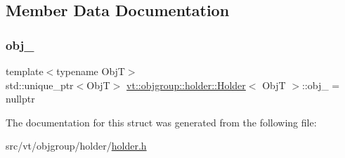 \subsection{Member Data Documentation}
\mbox{\label{structvt_1_1objgroup_1_1holder_1_1_holder_a098ec3be989e0d95a1ad8d1a31db3eb2}} 
\subsubsection{\texorpdfstring{obj\+\_\+}{obj\_}}
{\footnotesize\ttfamily template$<$typename ObjT$>$ \\
std\+::unique\+\_\+ptr$<$ObjT$>$ \hyperlink{structvt_1_1objgroup_1_1holder_1_1_holder}{vt\+::objgroup\+::holder\+::\+Holder}$<$ ObjT $>$\+::obj\+\_\+ = nullptr\hspace{0.3cm}{\ttfamily [private]}}



The documentation for this struct was generated from the following file\+:\begin{DoxyCompactItemize}
\item 
src/vt/objgroup/holder/\hyperlink{objgroup_2holder_2holder_8h}{holder.\+h}\end{DoxyCompactItemize}
